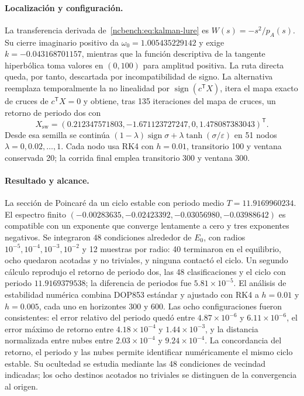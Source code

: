 \paragraph{Localización y configuración.}
La transferencia derivada de~\eqref{ncbench:eq:kalman-lure} es
\(W(s)=-s^2/p_A(s)\). Su cierre imaginario positivo da
\(\omega_0=1.005435229142\) y exige
\(k=-0.043168701157\), mientras que la función descriptiva de la tangente
hiperbólica toma valores en \((0,100)\) para amplitud positiva. La ruta directa
queda, por tanto, descartada por incompatibilidad de signo. La alternativa
reemplaza temporalmente la no linealidad por
\(\operatorname{sign}(c^{\mathsf T}X)\), itera el mapa exacto de cruces de
\(c^{\mathsf T}X=0\) y obtiene, tras 135 iteraciones del mapa de cruces, un
retorno de periodo dos con
\begin{equation}
 X_{\mathrm{sw}}=(0.212347571803,-1.671123727247,0,
 1.478087383043)^{\mathsf T}.
 \label{ncbench:eq:kalman-switching-seed}
\end{equation}
Desde esa semilla se continúa
\((1-\lambda)\operatorname{sign}\sigma+
\lambda\tanh(\sigma/\varepsilon)\) en 51 nodos
\(\lambda=0,0.02,\ldots,1\). Cada nodo usa RK4 con \(h=0.01\), transitorio
100 y ventana conservada 20; la corrida final emplea transitorio 300 y ventana
300.

\paragraph{Resultado y alcance.}
La sección de Poincaré da un ciclo estable con periodo medio
\(T=11.9169960234\). El espectro finito
\((-0.00283635,-0.02423392,-0.03056980,-0.03988642)\) es compatible con un
exponente que converge lentamente a cero y tres exponentes negativos. Se
integraron 48 condiciones alrededor de \(E_0\), con radios
\(10^{-5},10^{-4},10^{-3},10^{-2}\) y 12 muestras por radio: 40 terminaron
en el equilibrio, ocho quedaron acotadas y no triviales, y ninguna contactó
el ciclo. Un segundo cálculo reprodujo el retorno de periodo dos,
las 48 clasificaciones y el ciclo con periodo \(11.9169379538\); la diferencia
de periodos fue \(5.81\times10^{-5}\). El análisis de estabilidad
numérica combina DOP853 estándar y ajustado con RK4 a
\(h=0.01\) y \(h=0.005\), cada uno en horizontes 300 y 600. Las ocho
configuraciones fueron consistentes: el error relativo del periodo quedó entre
\(4.87\times10^{-6}\) y \(6.11\times10^{-6}\), el error máximo de retorno
entre \(4.18\times10^{-4}\) y \(1.44\times10^{-3}\), y la distancia
normalizada entre nubes entre \(2.03\times10^{-4}\) y
\(9.24\times10^{-4}\). La concordancia del retorno, el periodo y las
nubes permite identificar numéricamente el mismo ciclo estable. Su
ocultedad se estudia mediante las 48 condiciones de vecindad indicadas;
los ocho destinos acotados no triviales se distinguen de la convergencia
al origen.

